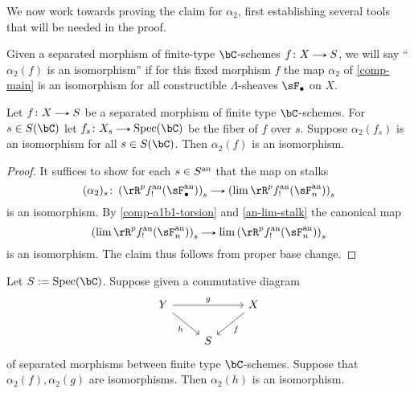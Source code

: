 \begin{nothing}
  \label{comp-a2}
  We now work towards proving the claim for $\alpha_2$, first establishing several tools that will be needed in the proof.

  \begin{subterminology}
    \label{comp-a2-terminology}
    Given a separated morphism of finite-type $\bC$-schemes $f \c X \to S$, we will say ``$\alpha_2(f)$ is an isomorphism'' if for this fixed morphism $f$ the map $\alpha_2$ of \cref{comp-main} is an isomorphism for all constructible $\Lambda$-sheaves $\sF_\bullet$ on $X$.
  \end{subterminology}

  \begin{sublemma}
    \label{comp-a2-fiber}
    Let $f \c X \to S$ be a separated morphism of finite type $\bC$-schemes. For $s \in S(\bC)$ let $f_s \c X_s \to \Spec(\bC)$ be the fiber of $f$ over $s$. Suppose $\alpha_2(f_s)$ is an isomorphism for all $s \in S(\bC)$. Then $\alpha_2(f)$ is an isomorphism.
    
    \begin{proof}
      It suffices to show for each $s \in S^{\mathrm{an}}$ that the map on stalks
      \[
        (\alpha_2)_s \c \l(\rR^p f^\an_!(\sF_\bullet^\an)\r)_s \to \l(\lim \rR^pf^\an_!(\sF_n^\an)\r)_s
      \]
      is an isomorphism. By \cref{comp-a1b1-torsion} and \cref{an-lim-stalk} the canonical map
      \[
        \l(\lim \rR^pf^\an_!(\sF_n^\an)\r)_s \to \lim {\l(\rR^pf^\an_!(\sF_n^\an)\r)_s}
      \]
      is an isomorphism. The claim thus follows from proper base change.
    \end{proof}
  \end{sublemma}
  
  \begin{sublemma}
    \label{comp-a2-leray}
    Let $S \ce \Spec(\bC)$. Suppose given a commutative diagram
    \[
      \begin{tikzcd}
        Y \ar[rr, "g"] \ar[rd, "h", swap] &
        &
        X \ar[ld, "f"] \\
        &
        S
        &
      \end{tikzcd}
    \]
    of separated morphisms between finite type $\bC$-schemes. Suppose that $\alpha_2(f), \alpha_2(g)$ are isomorphisms. Then $\alpha_2(h)$ is an isomorphism.


\end{sublemma}
\end{nothing}

